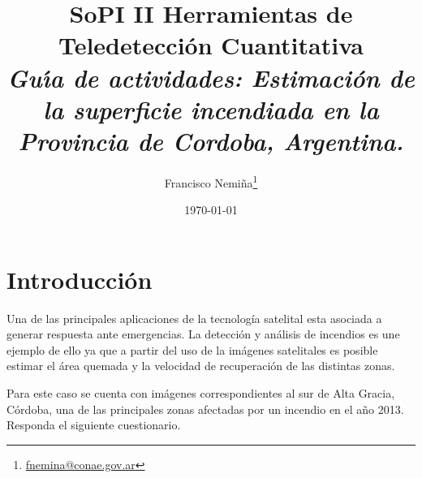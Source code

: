 \documentclass[hidelinks,12pt]{article}
\title{SoPI II \- Herramientas de Teledetecci\'on Cuantitativa \\ 
\emph{Gu\'{\i}a de actividades: Estimación de la superficie incendiada en 
la Provincia de Cordoba, Argentina.}}
\author{Francisco
Nemi\~na\thanks{\href{mailto:fnemina@conae.govar}{fnemina@conae.gov.ar}}}
\affil{Unidad de Educaci\'on y Formaci\'on Masiva\\ 
    Comisi\'on Nacional de Actividades Espaciales}
\date{\today}
\begin{document}
\maketitle

\section*{Introducci\'on}

Una de las principales aplicaciones de la tecnología satelital esta asociada a generar respuesta ante emergencias. La detección y análisis de incendios es une ejemplo de ello ya que a partir del uso de la imágenes satelitales es posible estimar el área quemada y la velocidad de recuperación de las distintas zonas.

Para este caso se cuenta con imágenes correspondientes al sur de Alta Gracia, Córdoba, una de las principales zonas afectadas por un incendio en el año 2013. Responda el siguiente cuestionario.
\newpage
\end{document}
